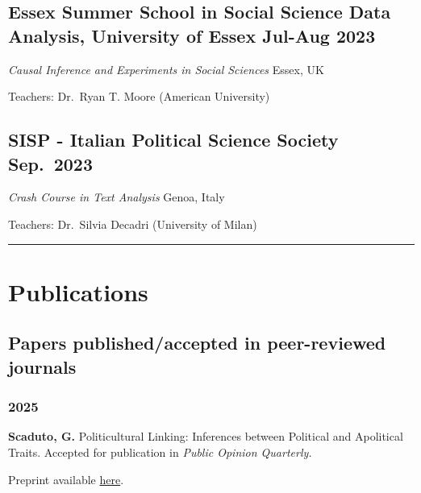 \documentclass[10pt,]{article}
\providecommand{\tightlist}{%
  \setlength{\itemsep}{0pt}\setlength{\parskip}{0pt}}
\renewenvironment{itemize}{
  \begin{list}{}{
    \setlength{\leftmargin}{1.5em}
  }
}{
  \end{list}
}
\begin{document}
\subsection{\texorpdfstring{Essex Summer School in Social Science Data
Analysis, University of Essex \hfill  Jul-Aug
2023}{Essex Summer School in Social Science Data Analysis, University of Essex Jul-Aug 2023}}\label{essex-summer-school-in-social-science-data-analysis-university-of-essex-jul-aug-2023-1}

\begin{itemize}
\tightlist
\item
  \emph{Causal Inference and Experiments in Social Sciences}
  \hfill Essex, UK
\item
  Teachers: Dr.~Ryan T. Moore (American University)
\end{itemize}

\subsection{\texorpdfstring{SISP - Italian Political Science Society
\hfill  Sep.~2023}{SISP - Italian Political Science Society Sep.~2023}}\label{sisp---italian-political-science-society-sep.-2023}

\begin{itemize}
\item
  \emph{Crash Course in Text Analysis} \hfill Genoa, Italy
\item
  Teachers: Dr.~Silvia Decadri (University of Milan)

  \bigskip \hrule
\end{itemize}

\section{Publications}\label{publications}

\subsection{Papers published/accepted in peer-reviewed
journals}\label{papers-publishedaccepted-in-peer-reviewed-journals}

\subsubsection{2025}\label{section}

\begin{enumerate}
\def\labelenumi{\arabic{enumi}.}
\setcounter{enumi}{8}
\tightlist
\item
  \textbf{Scaduto, G.} Politicultural Linking: Inferences between
  Political and Apolitical Traits. Accepted for publication in
  \emph{Public Opinion Quarterly.}

  \begin{itemize}
  \tightlist
  \item
    Preprint available
    \href{https://osf.io/preprints/socarxiv/zvcx2_v1}{here}.
  \end{itemize}
\end{enumerate}
\end{document}
